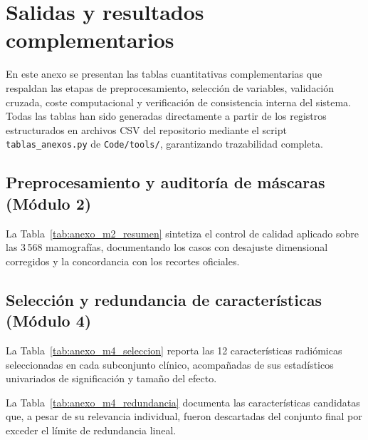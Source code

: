 
\section{Salidas y resultados complementarios}\label{anx:salidas}

En este anexo se presentan las tablas cuantitativas complementarias que respaldan las
etapas de preprocesamiento, selección de variables, validación cruzada, coste computacional
y verificación de consistencia interna del sistema. Todas las tablas han sido generadas
directamente a partir de los registros estructurados en archivos CSV del repositorio
mediante el script \texttt{tablas\_anexos.py} de \texttt{Code/tools/}, garantizando trazabilidad completa.

\subsection{Preprocesamiento y auditoría de máscaras (Módulo 2)}

La Tabla~\ref{tab:anexo_m2_resumen} sintetiza el control de calidad aplicado sobre las 3\,568
mamografías, documentando los casos con desajuste dimensional corregidos y la concordancia con
los recortes oficiales.



\subsection{Selección y redundancia de características (Módulo 4)}

La Tabla~\ref{tab:anexo_m4_seleccion} reporta las 12 características radiómicas seleccionadas
en cada subconjunto clínico, acompañadas de sus estadísticos univariados de significación y tamaño del efecto.



La Tabla~\ref{tab:anexo_m4_redundancia} documenta las características candidatas que, a pesar de su
relevancia individual, fueron descartadas del conjunto final por exceder el límite de redundancia lineal.

